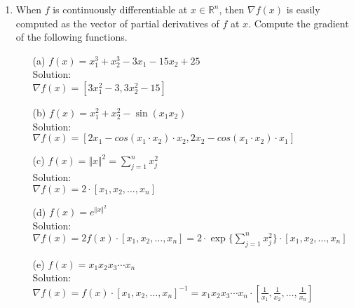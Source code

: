 \documentclass[12pt]{amsart}
\newcommand{\norm}[1]{\Vert #1 \Vert}
\newcommand{\Rn}{\R^n}
\newcommand{\R}{{\mathbb{R}}}
\newcommand{\grad}{\nabla}
\begin{document}
\begin{enumerate}
\item When $f$ is continuously differentiable at $x\in\Rn$,
then $\grad f(x)$ is easily computed as the vector of partial derivatives of $f$
at $x$.
Compute the gradient of the following functions.
\begin{enumerate}
\item[(a)] $f(x)=x_1^3+x_2^3-3x_1-15x_2+25 $\\

\noindent
Solution:\\
$\grad f(x) = [3x_1^2 - 3, 3x_2^2 - 15]$ \\

\item[(b)] $f(x)=x_1^2+x_2^2-\sin(x_1x_2)$ \\

\noindent
Solution:\\
$\grad f(x) = [2x_1 - cos(x_1 \cdot x_2) \cdot x_2, 2x_2 - cos(x_1 \cdot x_2) \cdot x_1]$ \\

\item[(c)] $f(x)=\norm{x}^2=\sum_{j=1}^nx_j^2$\\

\noindent
Solution:\\
$\grad f(x) = 2 \cdot [x_1, x_2, \ldots, x_n] $\\

\item[(d)] $f(x)=\displaystyle e^{\norm{x}^2}$\\

\noindent
Solution:\\
$\grad f(x) = 2f(x) \cdot [x_1, x_2, \ldots, x_n] = 2 \cdot \exp \{\displaystyle \sum_{j=1}^n x_j^2\} \cdot [x_1, x_2, \ldots, x_n]$\\


\item[(e)] $f(x)=x_1x_2x_3\cdots x_n $ \\

\noindent
Solution:\\
$\grad f(x) = f(x) \cdot [x_1, x_2, \ldots, x_n]^{-1} = x_1x_2x_3\cdots x_n \cdot [\frac{1}{x_1}, \frac{1}{x_2}, \ldots, \frac{1}{x_n}]$\\


\end{enumerate}
\end{enumerate}
\end{document}
